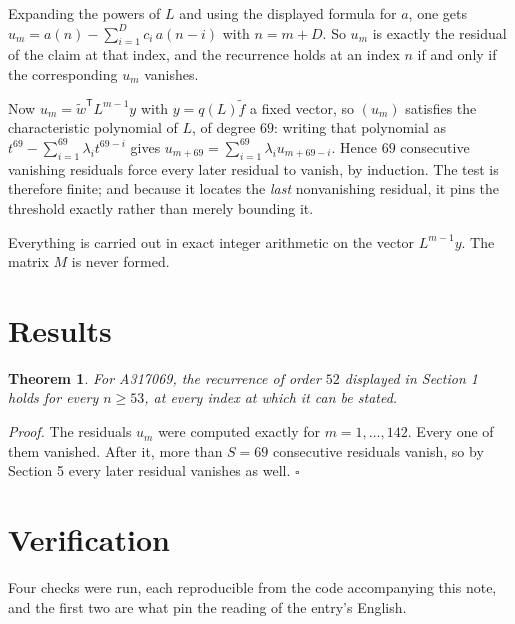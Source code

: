 \documentclass[11pt]{article}
\newtheorem{theorem}{Theorem}
\theoremstyle{definition}
\begin{document}
Expanding the powers of $L$ and using the displayed formula for $a$, one gets $u_m = a(n) - \sum_{i=1}^{D} c_i\,a(n-i)$ with $n = m + D$. So $u_m$ is exactly the residual of the claim at that index, and the recurrence holds at an index $n$ if and only if the corresponding $u_m$ vanishes.

Now $u_m = \tilde w^{\mathsf T} L^{m-1} y$ with $y = q(L)\tilde f$ a fixed vector, so $(u_m)$ satisfies the characteristic polynomial of $L$, of degree $69$: writing that polynomial as $t^{69} - \sum_{i=1}^{69} \lambda_i t^{69-i}$ gives $u_{m+69} = \sum_{i=1}^{69} \lambda_i u_{m+69-i}$. Hence $69$ consecutive vanishing residuals force every later residual to vanish, by induction. The test is therefore finite; and because it locates the {\itshape last} nonvanishing residual, it pins the threshold exactly rather than merely bounding it.

Everything is carried out in exact integer arithmetic on the vector $L^{m-1}y$. The matrix $M$ is never formed.

\section{Results}

\begin{theorem} For A317069, the recurrence of order $52$ displayed in Section 1 holds for every $n \ge 53$, at every index at which it can be stated.\end{theorem}

{\itshape Proof.} The residuals $u_m$ were computed exactly for $m = 1,\dots,142$. Every one of them vanished. After it, more than $S = 69$ consecutive residuals vanish, so by Section 5 every later residual vanishes as well. $\square$

\section{Verification}

Four checks were run, each reproducible from the code accompanying this note, and the first two are what pin the reading of the entry's English.
\end{document}
